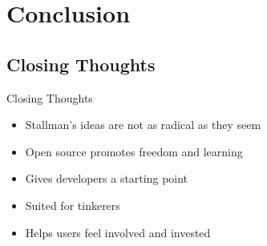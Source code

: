 \section{Conclusion}\frame{\sectionpage}

\subsection{Closing Thoughts}
\begin{frame}{Closing Thoughts}
  \begin{itemize}
    \item Stallman's ideas are not as radical as they seem
    \item Open source promotes freedom and learning
    \item Gives developers a starting point
    \item Suited for tinkerers
    \item Helps users feel involved and invested
  \end{itemize}
\end{frame}
